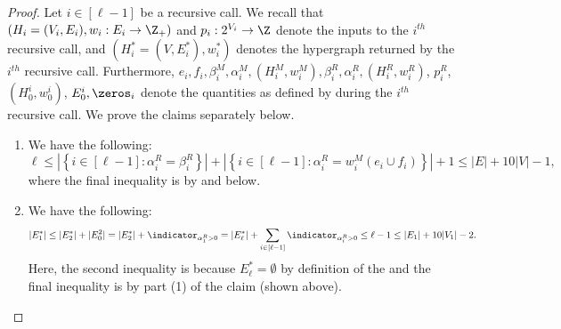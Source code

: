 \begin{proof}
Let $i \in [\ell - 1]$ be a recursive call. We recall that $(H_i = (V_i, E_i), w_i:E_i \rightarrow \Z_+)$ and $p_i : 2^{V_i} \rightarrow \Z$ denote the inputs to the $i^{th}$ recursive call, and $(H_i^* = (V, E_i^*), w_i^*)$ denotes the hypergraph returned by the $i^{th}$ recursive call. Furthermore, $e_i, f_i, \beta_i^M, \alpha_i^M, (H_i^M, w_i^M), \beta_i^R, \alpha_i^R, (H_i^R, w_i^R)$, $p_i^R$, $(H_0^{i}, w_0^{i})$, $E_0^i, \zeros_i$ denote the quantities  as defined by  during the $i^{th}$ recursive call.
    We prove the claims separately below.
    \begin{enumerate}
        \item We have the following:
        $$\ell \leq \left|\left\{i \in [\ell - 1] : \alpha_i^R = \beta_i^R\right\}\right|  +  \left|\left\{i \in [\ell- 1] : \alpha_i^R = w_i^M(e_i \cup f_i)\right\}\right| + 1 \leq |E| + 10|V| - 1,$$
        where the final inequality is by  and  below.
        \item 
        We have the following:
        $$|E_1^*| \leq |E_2^*| + |E_0^2| =   |E_{2}^*| + \indicator_{\alpha_1^R > 0} = |E_{\ell}^*| + \sum_{i \in [\ell - 1]}\indicator_{\alpha_i^R > 0} \leq \ell - 1\leq |E_1| + 10|V_1| - 2.$$
        Here, the second inequality is because $E_{\ell}^* = \emptyset$ by definition of the  and the final inequality is by part (1) of the claim (shown above).
    \end{enumerate}
\end{proof}


